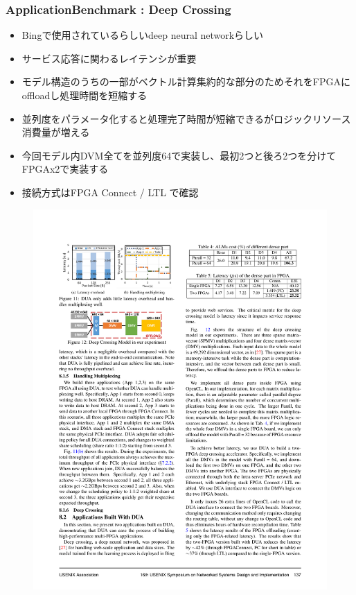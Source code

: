 \documentclass[dvipdfmx,9pt,notheorems]{beamer}
\theoremstyle{definition}
\begin{document}
\begin{frame}\frametitle{ApplicationBenchmark : Deep Crossing}
	\begin{itemize}
			\item Bingで使用されているらしいdeep neural networkらしい
			\item サービス応答に関わるレイテンシが重要
			\item モデル構造のうちの一部がベクトル計算集約的な部分のためそれをFPGAにoffloadし処理時間を短縮する
			\item 並列度をパラメータ化すると処理完了時間が短縮できるがロジックリソース消費量が増える
			\item 今回モデル内DVM全てを並列度64で実装し、最初2つと後ろ2つを分けてFPGAx2で実装する
			\item 接続方式はFPGA Connect / LTL で確認
	\end{itemize}
  \begin{figure}[htb]
		\includegraphics[scale=1.0]{fig/figure12.pdf}
  \end{figure}
\pnote{
}
\end{frame}
\end{document}
